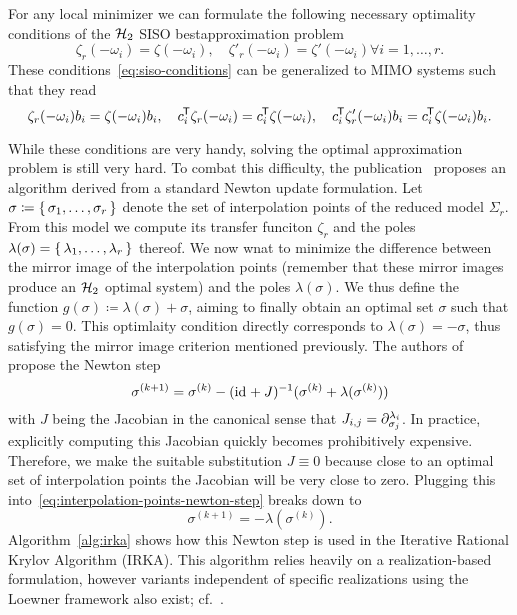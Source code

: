 
For any local minimizer we can formulate the following necessary optimality conditions of the $\mcl{H}_2$ SISO bestapproximation problem
\begin{equation}\label{eq:siso-conditions}
    \zeta_r(- \omega_i) = \zeta(- \omega_i),\quad \zeta'_r(- \omega_i) = \zeta'(- \omega_i) \forall i = 1, \dots, r.
\end{equation}
These conditions~\eqref{eq:siso-conditions} can be generalized to MIMO systems such that they read
\begin{equation}\label{eq:mimo-conditions}
    \zeta_r(- \omega_i) b_i = \zeta(- \omega_i) b_i,\quad c_i\trans \zeta_r(- \omega_i) = c_i\trans \zeta(- \omega_i),\quad c_i\trans \zeta'_r(- \omega_i) b_i = c_i\trans \zeta(- \omega_i) b_i.
\end{equation}

While these conditions are very handy, solving the optimal approximation problem is still very hard.
To combat this difficulty, the publication~\cite{Gugercin2008} proposes an algorithm derived from a standard Newton update formulation.
Let $\sigma \coloneqq \sset{\sigma_1, \dots, \sigma_r}$ denote the set of interpolation points of the reduced model $\Sigma_r$.
From this model we compute its transfer funciton $\zeta_r$ and the poles $\lambda(\sigma) = \sset{\lambda_1, \dots, \lambda_r}$ thereof.
We now wnat to minimize the difference between the mirror image of the interpolation points (remember that these mirror images produce an $\mcl{H}_2$ optimal system) and the poles $\lambda(\sigma)$.
We thus define the function $g(\sigma) \coloneqq \lambda(\sigma) + \sigma$, aiming to finally obtain an optimal set $\sigma$ such that $g(\sigma) = 0$.
This optimlaity condition directly corresponds to $\lambda(\sigma) = -\sigma$, thus satisfying the mirror image criterion mentioned previously.
The authors of~\cite{Gugercin2008} propose the Newton step
\begin{equation}\label{eq:interpolation-points-newton-step}
    \sigma^{(k + 1)} = \sigma^{(k)} - (\id + J)\inv (\sigma^{(k)} + \lambda(\sigma^{(k)}))
\end{equation}
with $J$ being the Jacobian in the canonical sense that $J_{i, j} = \pd[\sigma_j]{\lambda_i}$.
In practice, explicitly computing this Jacobian quickly becomes prohibitively expensive.
Therefore, we make the suitable substitution $J \equiv 0$ because close to an optimal set of interpolation points the Jacobian will be very close to zero.
Plugging this into~\eqref{eq:interpolation-points-newton-step} breaks down to
\begin{equation*}
    \sigma^{(k + 1)} = - \lambda(\sigma^{(k)}).
\end{equation*}
Algorithm~\ref{alg:irka} shows how this Newton step is used in the Iterative Rational Krylov Algorithm (IRKA).
This algorithm relies heavily on a realization-based formulation, however variants independent of specific realizations using the Loewner framework also exist; cf.~\cite[Algorithm~7.2]{Beattie2017}.

